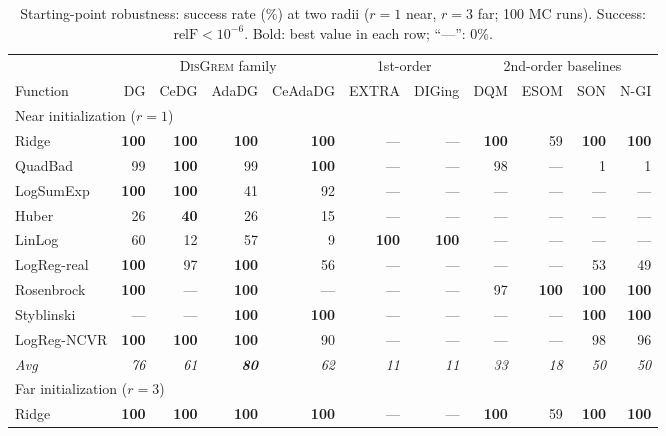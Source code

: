 \documentclass[review,onefignum,onetabnum]{siamart171218}
\begin{document}
	\begin{table}[htbp]
		\centering
		\caption{Starting-point robustness: success rate (\%)
			at two radii ($r{=}1$ near, $r{=}3$ far; 100 MC runs).
			Success: $\mathrm{relF}<10^{-6}$.
			Bold: best value in each row; ``---'': 0\%.}
		\label{tab:robust}
		\setlength{\tabcolsep}{3pt}
		\footnotesize
		\begin{tabular}{l rrrr rr rrrr}
			\toprule
			& \multicolumn{4}{c}{\textsc{DisGrem} family}
			& \multicolumn{2}{c}{1st-order}
			& \multicolumn{4}{c}{2nd-order baselines} \\
			\cmidrule(lr){2-5}\cmidrule(lr){6-7}\cmidrule(lr){8-11}
			Function & DG & CeDG & AdaDG & CeAdaDG
			& EXTRA & DIGing & DQM & ESOM & SON & N-GI \\
			\midrule
			\multicolumn{11}{l}{Near initialization ($r{=}1$)} \\
			\midrule
			Ridge       & \textbf{100} & \textbf{100} & \textbf{100} & \textbf{100} & --- & --- & \textbf{100} & 59 & \textbf{100} & \textbf{100} \\
			QuadBad     & 99 & \textbf{100} & 99  & \textbf{100} & --- & --- & 98  & --- & 1   & 1   \\
			LogSumExp   & \textbf{100} & \textbf{100} & 41  & 92  & --- & --- & --- & --- & --- & --- \\
			Huber       & 26 & \textbf{40}  & 26  & 15  & --- & --- & --- & --- & --- & --- \\
			LinLog      & 60 & 12  & 57  & 9   & \textbf{100} & \textbf{100} & --- & --- & --- & --- \\
			LogReg-real & \textbf{100} & 97  & \textbf{100} & 56  & --- & --- & --- & --- & 53  & 49  \\
			Rosenbrock  & \textbf{100} & --- & \textbf{100} & --- & --- & --- & 97  & \textbf{100} & \textbf{100} & \textbf{100} \\
			Styblinski  & --- & --- & \textbf{100} & \textbf{100} & --- & --- & --- & --- & \textbf{100} & \textbf{100} \\
			LogReg-NCVR & \textbf{100} & \textbf{100} & \textbf{100} & 90  & --- & --- & --- & --- & 98  & 96  \\
			\textit{Avg} & \textit{76} & \textit{61} & \textbf{\textit{80}} & \textit{62}
			& \textit{11} & \textit{11} & \textit{33} & \textit{18}
			& \textit{50} & \textit{50} \\
			\midrule
			\multicolumn{11}{l}{Far initialization ($r{=}3$)} \\
			\midrule
			Ridge       & \textbf{100} & \textbf{100} & \textbf{100} & \textbf{100} & --- & --- & \textbf{100} & 59  & \textbf{100} & \textbf{100} \\

\end{tabular}
\end{table}
\end{document}
